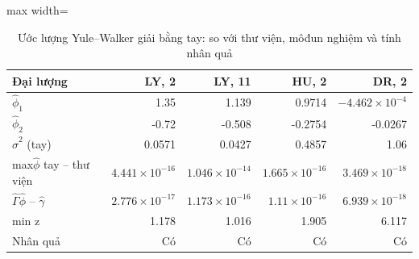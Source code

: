 \begin{table}[H]
\centering\footnotesize
\caption{Ước lượng Yule–Walker giải bằng tay: so với thư viện, môđun nghiệm và tính nhân quả}\label{tab:tab_b11_07_yule_walker}
\begin{adjustbox}{max width=\linewidth}
\begin{tabular}{|l|r|r|r|r|}
\toprule
Đại lượng & LY, 2 & LY, 11 & HU, 2 & DR, 2 \\
\midrule
$\hat{\phi}_{1}$ & 1.35 & 1.139 & 0.9714 & $-4.462\times10^{-4}$ \\
$\hat{\phi}_{2}$ & -0.72 & -0.508 & -0.2754 & -0.0267 \\
$\hat{\sigma}^{2}$ (tay) & 0.0571 & 0.0427 & 0.4857 & 1.06 \\
max\textbar{}$\hat{\phi}$ tay – thư viện\textbar{} & $4.441\times10^{-16}$ & $1.046\times10^{-14}$ & $1.665\times10^{-16}$ & $3.469\times10^{-18}$ \\
\textbar{}$\hat{\Gamma}\hat{\phi}$ – $\hat{\gamma}$\textbar{} & $2.776\times10^{-17}$ & $1.173\times10^{-16}$ & $1.11\times10^{-16}$ & $6.939\times10^{-18}$ \\
min \textbar{}z\textbar{} & 1.178 & 1.016 & 1.905 & 6.117 \\
Nhân quả & Có & Có & Có & Có \\
\bottomrule
\end{tabular}
\end{adjustbox}
\end{table}
